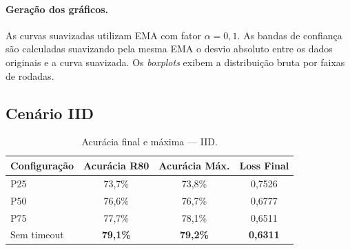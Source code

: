 \documentclass[12pt, a4paper]{article}
\begin{document}
\paragraph{Geração dos gráficos.}
As curvas suavizadas utilizam EMA com fator $\alpha = 0{,}1$. As bandas de confiança
são calculadas suavizando pela mesma EMA o desvio absoluto entre os dados originais
e a curva suavizada. Os \textit{boxplots} exibem a distribuição bruta por faixas de rodadas.

\subsection{Cenário IID}

\begin{table}[H]
\centering
\caption{Acurácia final e máxima — IID.}
\label{tab:timeout_iid_acc}
\renewcommand{\arraystretch}{1.25}
\begin{tabular}{lccc}
\toprule
\textbf{Configuração} & \textbf{Acurácia R80} & \textbf{Acurácia Máx.} & \textbf{Loss Final} \\
\midrule
P25         & 73{,}7\% & 73{,}8\% & 0{,}7526 \\
P50         & 76{,}6\% & 76{,}7\% & 0{,}6777 \\
P75         & 77{,}7\% & 78{,}1\% & 0{,}6511 \\
Sem timeout & \textbf{79{,}1\%} & \textbf{79{,}2\%} & \textbf{0{,}6311} \\
\bottomrule
\end{tabular}
\end{table}

\begin{table}[H]
\centering
\caption{Tempo de execução e eficiência por hora — IID.}
\label{tab:timeout_iid_time}
\renewcommand{\arraystretch}{1.25}
\end{table}
\end{document}
